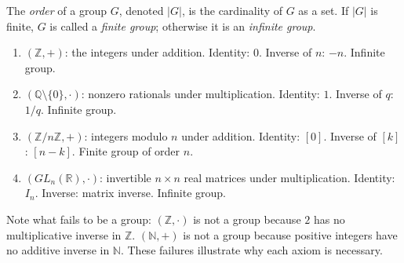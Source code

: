 \begin{definition}
\label{def:notes-groups-definition-l54}
The \emph{order} of a group $G$, denoted $|G|$, is the cardinality of $G$
as a set. If $|G|$ is finite, $G$ is called a \emph{finite group};
otherwise it is an \emph{infinite group}.
\end{definition}

\begin{example}
\begin{enumerate}[label=(\roman*)]
  \item $(\mathbb{Z}, +)$: the integers under addition.
        Identity: $0$. Inverse of $n$: $-n$. Infinite group.

  \item $(\mathbb{Q} \setminus \{0\}, \cdot)$: nonzero rationals under multiplication.
        Identity: $1$. Inverse of $q$: $1/q$. Infinite group.

  \item $(\mathbb{Z}/n\mathbb{Z}, +)$: integers modulo $n$ under addition.
        Identity: $[0]$. Inverse of $[k]$: $[n-k]$. Finite group of order $n$.

  \item $(GL_n(\mathbb{R}), \cdot)$: invertible $n \times n$ real matrices
        under multiplication.
        Identity: $I_n$. Inverse: matrix inverse. Infinite group.
\end{enumerate}
\end{example}

\begin{remark}
Note what fails to be a group:
$(\mathbb{Z}, \cdot)$ is not a group because $2$ has no multiplicative
inverse in $\mathbb{Z}$.
$(\mathbb{N}, +)$ is not a group because positive integers have no
additive inverse in $\mathbb{N}$.
These failures illustrate why each axiom is necessary.
\end{remark}
